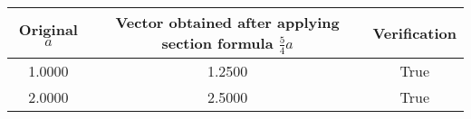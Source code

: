\begin{tabular}{|c|c|c|}
\hline
Original $a$ & Vector obtained after applying section formula $\frac{5}{4}a$ & Verification \\ 
\hline
1.0000 & 1.2500 & True \\ 
2.0000 & 2.5000 & True \\ 
\hline
\end{tabular}
